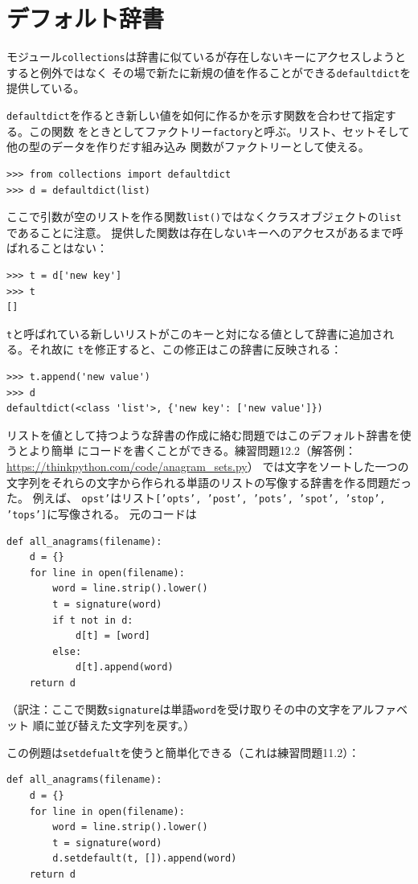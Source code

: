 \documentclass[a4j,12pt,makeidx]{jbook}
\begin{document}
\section{デフォルト辞書}
モジュール{\tt collections}は辞書に似ているが存在しないキーにアクセスしようとすると例外ではなく
その場で新たに新規の値を作ることができる{\tt defaultdict}を提供している。\par
{\tt defaultdict}を作るとき新しい値を如何に作るかを示す関数を合わせて指定する。この関数
をときとしてファクトリー{\tt factory}と呼ぶ。リスト、セットそして他の型のデータを作りだす組み込み
関数がファクトリーとして使える。
\begin{verbatim}
>>> from collections import defaultdict
>>> d = defaultdict(list)
\end{verbatim}
ここで引数が空のリストを作る関数{\tt list()}ではなくクラスオブジェクトの{\tt list}であることに注意。
提供した関数は存在しないキーへのアクセスがあるまで呼ばれることはない：
\begin{verbatim}
>>> t = d['new key']
>>> t
[]
\end{verbatim}
{\tt t}と呼ばれている新しいリストがこのキーと対になる値として辞書に追加される。それ故に
{\tt t}を修正すると、この修正はこの辞書に反映される：
\begin{verbatim}
>>> t.append('new value')
>>> d
defaultdict(<class 'list'>, {'new key': ['new value']})
\end{verbatim}
リストを値として持つような辞書の作成に絡む問題ではこのデフォルト辞書を使うとより簡単
にコードを書くことができる。練習問題12.2（解答例：\url{https://thinkpython.com/code/anagram_sets.py}）
では文字をソートした一つの文字列をそれらの文字から作られる単語のリストの写像する辞書を作る問題だった。
例えば、 {\tt opst'}はリスト{\tt ['opts', 'post', 'pots', 'spot', 'stop', 'tops']}に写像される。
元のコードは
\begin{verbatim}
def all_anagrams(filename):
    d = {}
    for line in open(filename):
        word = line.strip().lower()
        t = signature(word)
        if t not in d:
            d[t] = [word]
        else:
            d[t].append(word)
    return d
\end{verbatim}
（訳注：ここで関数{\tt signature}は単語{\tt word}を受け取りその中の文字をアルファベット
順に並び替えた文字列を戻す。） \par
この例題は{\tt setdefualt}を使うと簡単化できる（これは練習問題11.2）：
\begin{verbatim}
def all_anagrams(filename):
    d = {}
    for line in open(filename):
        word = line.strip().lower()
        t = signature(word)
        d.setdefault(t, []).append(word)
    return d
\end{verbatim}
\end{document}
